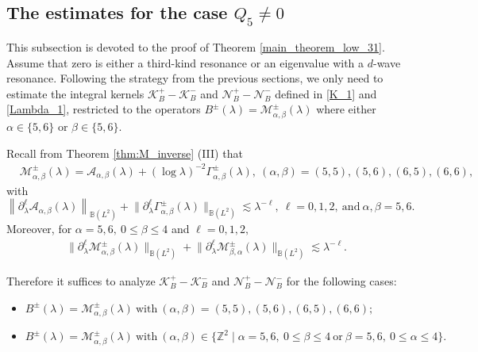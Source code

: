\documentclass[reqno]{amsart}
\numberwithin{equation}{section}
\begin{document}
\subsection{The estimates for the case $Q_{5} \neq 0$}     
 This subsection is devoted to the proof of Theorem \ref{main_theorem_low_31}. Assume that zero is either a third-kind resonance or an eigenvalue with a $d$-wave resonance. Following the strategy from the previous sections, we only need to estimate the integral kernels $\mathcal{K}_{B}^+-\mathcal{K}_{B}^-$ and $\mathcal{N}_{B}^+-\mathcal{N}_{B}^-$ defined in \eqref{K_1} and \eqref{Lambda_1}, restricted to the operators $B^\pm(\lambda)=\mathcal{M}_{\alpha, \beta}^{\pm}(\lambda)$ where either $\alpha \in \{5,6\}$ or $\beta \in \{5,6\}$.  

Recall from Theorem \ref{thm:M_inverse} (III) that
\[
	 \begin{aligned}
&\mathcal{M}_{\alpha,\beta}^\pm(\lambda)= \mathcal{A}_{\alpha,\beta}(\lambda)+(\log \lambda)^{-2}\Gamma_{\alpha,\beta}^{\pm}(\lambda), \ (\alpha,\beta)=(5,5),(5,6),(6,5), (6,6),
	\end{aligned}
    \]
with
$$
\left\|\partial_\lambda^{\ell} \mathcal{A}_{\alpha,\beta}(\lambda)\right\|_{\mathbb{B}\left(L^2\right)}
+\big\|\partial_\lambda^{\ell} \Gamma_{\alpha, \beta}^{ \pm}(\lambda) \big\|_{\mathbb{B}\left(L^2\right)} \lesssim \lambda^{-\ell},
\ \ell=0,1,2,\ \text{and}\ \alpha,\beta=5,6.
$$
Moreover, for $ \alpha=5,6, \ 0 \le \beta \le 4$ and $\ell=0,1,2,$
\begin{align*}
\big\|\partial_\lambda^{\ell} \mathcal{M}_{\alpha,\beta}^\pm(\lambda)\big\|_{\mathbb{B}\left(L^2\right)}
+\big\|\partial_\lambda^{\ell} \mathcal{M}_{\beta,\alpha}^\pm(\lambda)\big\|_{\mathbb{B}\left(L^2\right)}
\lesssim \lambda^{-\ell}.
\end{align*}

Therefore it suffices to analyze $\mathcal{K}_{B}^+-\mathcal{K}_{B}^-$ and $\mathcal{N}_{B}^+-\mathcal{N}_{B}^-$ for the following cases:
\begin{itemize}
	\item $B^\pm(\lambda)=\mathcal{M}_{\alpha,\beta}^\pm(\lambda) \ \text{with} \ (\alpha,\beta)=(5,5),(5,6),(6,5),(6,6);$
	\item $ B^\pm(\lambda)= \mathcal{M}_{\alpha, \beta}^\pm(\lambda) \ \text{with} \  (\alpha,\beta)  \in \{ \mathbb{Z}^2 \mid \alpha=5,6,\ 0 \le \beta \le 4 \ \text{or} \ \beta=5,6,\ 0 \le \alpha \le 4\}.$
\end{itemize}
\end{document}
